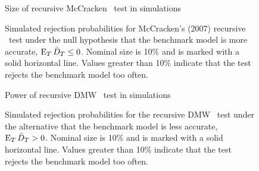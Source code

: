 \documentclass[12pt,draft]{article}
\begin{document}
\begin{figure}\centering
  {\large Size of recursive McCracken \oost\ test in simulations}
  
  \caption{Simulated rejection probabilities for McCracken's (2007)
    recursive \oost\ test under the null hypothesis that the benchmark
    model is more accurate, $\operatorname{E}_T \bar{D}_{T} \leq 0$. Nominal size is 10\%
    and is marked with a solid horizontal line. Values greater than
    10\% indicate that the test rejects the benchmark model too
    often.}
  \label{fig:mccracken}
\end{figure}

\begin{figure}\centering
  {\large Power of recursive DMW \oost\ test in simulations}
  
  \caption{Simulated rejection probabilities for the recursive DMW
    \oost\ test under the alternative that the benchmark model is less
    accurate, $\operatorname{E}_T \bar{D}_{T} > 0$. Nominal size is 10\% and is marked
    with a solid horizontal line. Values greater than 10\% indicate
    that the test rejects the benchmark model too often.}
  \label{fig:ttest-power}
\end{figure}
\end{document}
